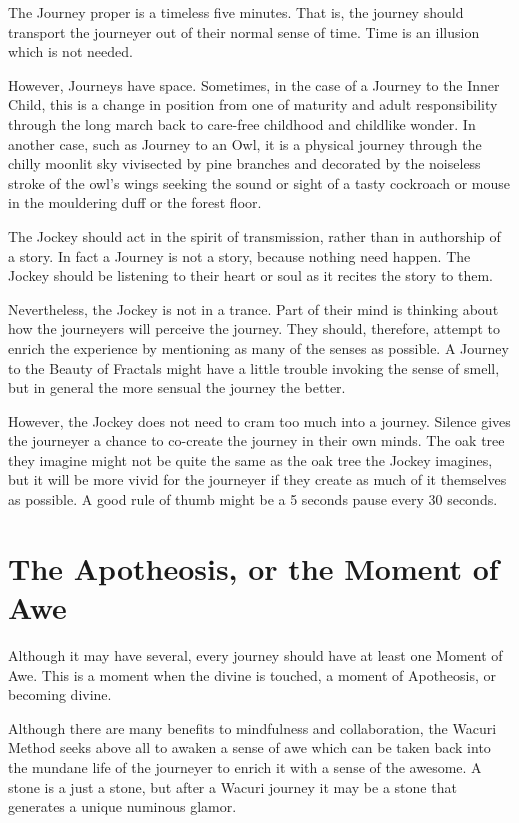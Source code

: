 \documentclass[12pt]{book}
\begin{document}
The Journey proper is a timeless five minutes. That is,
the journey should transport the journeyer out of their normal sense
of time. Time is an illusion which is not needed.

However, Journeys have space. Sometimes, in the case of a
Journey to the Inner Child, this is a change in position from
one of maturity and adult responsibility through the long march
back to care-free childhood and childlike wonder.  In another case,
such as Journey to an Owl, it is a physical journey through
the chilly moonlit sky vivisected by pine branches and decorated
by the noiseless stroke of the owl's wings seeking the sound
or sight of a tasty cockroach or mouse in the mouldering duff
or the forest floor.

The Jockey should act in the spirit of transmission,
rather than in authorship of a story. In fact a Journey is
not a story, because nothing need happen. The Jockey should
be listening to their heart or soul as it recites the
story to them.

Nevertheless, the Jockey is not in a trance. Part of their
mind is thinking about how the journeyers will perceive the
journey.  They should, therefore, attempt to enrich the
experience by mentioning as many of the senses as possible.
A Journey to the Beauty of Fractals might have a little
trouble invoking the sense of smell, but in general
the more sensual the journey the better.

However, the Jockey does not need to cram too much
into a journey. Silence gives the journeyer a chance
to co-create the journey in their own minds. The oak tree
they imagine might not be quite the same as the oak tree
the Jockey imagines, but it will be more vivid for the
journeyer if they create as much of it themselves as
possible.  A good rule of thumb might be a 5 seconds
pause every 30 seconds.

\section{ The Apotheosis, or the Moment of Awe}

Although it may have several, every journey should have
at least one Moment of Awe. This is a moment when the
divine is touched, a moment of Apotheosis, or becoming divine.

Although there are many benefits to mindfulness and
collaboration, the Wacuri Method seeks above all to
awaken a sense of awe which can be taken back into the
mundane life of the journeyer to enrich it with a sense
of the awesome. A stone is a just a stone, but after a
Wacuri journey it may be a stone that generates a unique
numinous glamor.
\end{document}
